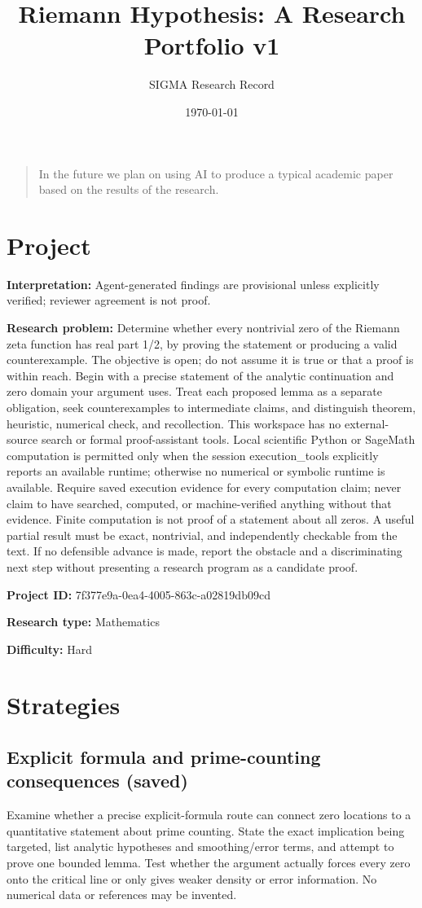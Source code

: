 \documentclass[11pt]{article}
\title{Riemann Hypothesis: A Research Portfolio v1}
\author{SIGMA Research Record}
\date{\today}
\begin{document}
\maketitle
\begin{quote}\small In the future we plan on using AI to produce a typical academic paper based on the results of the research.\end{quote}
\section{Project}
\textbf{Interpretation:} Agent-generated findings are provisional unless explicitly verified; reviewer agreement is not proof.\par
\textbf{Research problem:} Determine whether every nontrivial zero of the Riemann zeta function has real part 1/2, by proving the statement or producing a valid counterexample. The objective is open; do not assume it is true or that a proof is within reach. Begin with a precise statement of the analytic continuation and zero domain your argument uses. Treat each proposed lemma as a separate obligation, seek counterexamples to intermediate claims, and distinguish theorem, heuristic, numerical check, and recollection. This workspace has no external-source search or formal proof-assistant tools. Local scientific Python or SageMath computation is permitted only when the session execution\_tools explicitly reports an available runtime; otherwise no numerical or symbolic runtime is available. Require saved execution evidence for every computation claim; never claim to have searched, computed, or machine-verified anything without that evidence. Finite computation is not proof of a statement about all zeros. A useful partial result must be exact, nontrivial, and independently checkable from the text. If no defensible advance is made, report the obstacle and a discriminating next step without presenting a research program as a candidate proof.\par
\textbf{Project ID:} 7f377e9a-0ea4-4005-863c-a02819db09cd\par
\textbf{Research type:} Mathematics\par
\textbf{Difficulty:} Hard\par
\section{Strategies}
\subsection{Explicit formula and prime-counting consequences (saved)}
Examine whether a precise explicit-formula route can connect zero locations to a quantitative statement about prime counting. State the exact implication being targeted, list analytic hypotheses and smoothing/error terms, and attempt to prove one bounded lemma. Test whether the argument actually forces every zero onto the critical line or only gives weaker density or error information. No numerical data or references may be invented.\par
\end{document}

